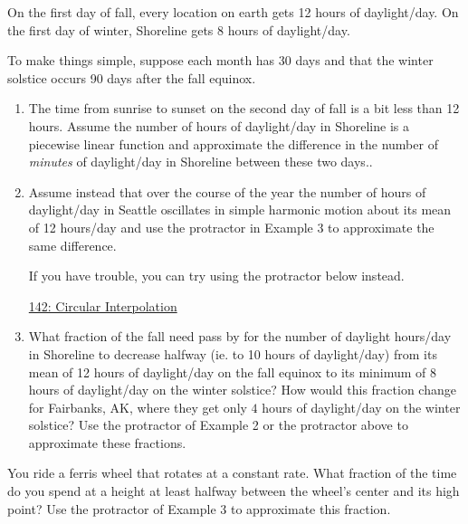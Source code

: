 \documentclass{ximera}
\begin{document}
\begin{example} \label{Ex:Lfe3r340943210}
On the first day of fall, every location on earth gets 12 hours of daylight/day. On the first day of winter, Shoreline gets $8$ hours of daylight/day.

To make things simple, suppose each month has 30 days and that the winter solstice occurs 90 days after the fall equinox.

\begin{enumerate}
\item The time from sunrise to sunset on the second day of fall is a bit less than 12 hours. Assume the number of hours of daylight/day in Shoreline is a piecewise linear function and approximate the difference in the number of \emph{minutes} of daylight/day in Shoreline between these two days..

\item Assume instead that over the course of the year the number of hours of daylight/day in Seattle oscillates in simple harmonic motion about its mean of 12 hours/day and use the protractor in Example 3 to approximate the same difference.

If you have trouble, you can try using the protractor below instead.

\begin{onlineOnly}
    \begin{center}
\end{center}
\end{onlineOnly}

\href{https://www.desmos.com/calculator/dhzo6hhjw1}{142: Circular Interpolation }



\item What fraction of the fall need pass by for the number of daylight hours/day in Shoreline to decrease halfway (ie. to 10 hours of daylight/day) from its mean of 12 hours of daylight/day on the fall equinox to its minimum of 8 hours of daylight/day on the winter solstice? How would this fraction change for Fairbanks, AK, where they get only $4$ hours of daylight/day on the winter solstice? Use the protractor of Example 2 or the protractor above to approximate these fractions.

\end{enumerate}
\end{example}

\begin{example}
You ride a ferris wheel that rotates at a constant rate. What fraction of the time do you spend at a height at least halfway between the wheel's center and its high point? Use the protractor of Example 3 to approximate this fraction.
\end{example}
\end{document}
